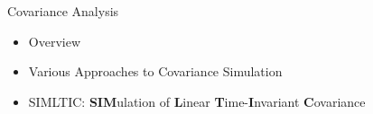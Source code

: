 \begin{frame}
Covariance Analysis
 \begin{itemize}
 \item Overview
 \item Various Approaches to Covariance Simulation
 \item SIMLTIC: \textbf{SIM}ulation of \textbf{L}inear \textbf{T}ime-\textbf{I}nvariant \textbf{C}ovariance
\end{itemize}
\end{frame}



